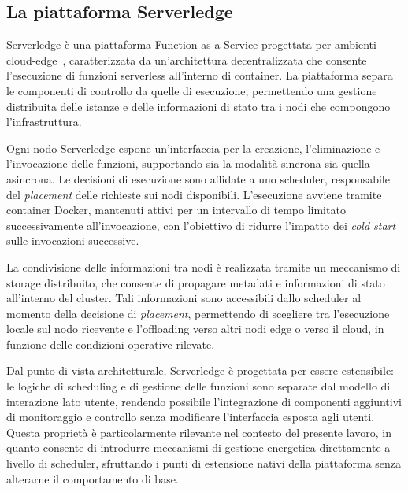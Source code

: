 \subsection{La piattaforma Serverledge}
\label{subsec:serverledge}

Serverledge è una piattaforma Function-as-a-Service progettata
per ambienti cloud-edge~\cite{Russo2023_Serverledge}, caratterizzata da
un'architettura decentralizzata che consente l'esecuzione di funzioni
serverless all'interno di container.
La piattaforma separa le componenti di
controllo da quelle di esecuzione, permettendo una gestione
distribuita delle istanze e delle informazioni di stato tra i
nodi che compongono l'infrastruttura.

Ogni nodo Serverledge espone un'interfaccia per la creazione,
l'eliminazione e l'invocazione delle funzioni, supportando sia
la modalità sincrona sia quella asincrona. Le decisioni di
esecuzione sono affidate a uno scheduler, responsabile del
\emph{placement} delle richieste sui nodi disponibili.
L'esecuzione avviene tramite container Docker, mantenuti attivi
per un intervallo di tempo limitato successivamente all'invocazione,
con l'obiettivo di ridurre l'impatto dei \emph{cold start} sulle
invocazioni successive.

La condivisione delle informazioni tra nodi è realizzata tramite
un meccanismo di storage distribuito, che consente di propagare
metadati e informazioni di stato all'interno del cluster. Tali
informazioni sono accessibili dallo scheduler al momento della
decisione di \emph{placement}, permettendo di scegliere tra
l'esecuzione locale sul nodo ricevente e l'offloading verso
altri nodi edge o verso il cloud, in funzione delle condizioni
operative rilevate.

Dal punto di vista architetturale, Serverledge è progettata per
essere estensibile: le logiche di scheduling e di gestione delle
funzioni sono separate dal modello di interazione lato utente,
rendendo possibile l'integrazione di componenti aggiuntivi di
monitoraggio e controllo senza modificare l'interfaccia esposta
agli utenti. Questa proprietà è particolarmente rilevante nel
contesto del presente lavoro, in quanto consente di introdurre
meccanismi di gestione energetica direttamente a livello di
scheduler, sfruttando i punti di estensione nativi della
piattaforma senza alterarne il comportamento di base.